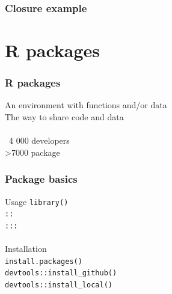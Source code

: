 \documentclass{beamer}
\begin{document}

\begin{frame}
	\frametitle{Closure example}
	\lstClosure
\end{frame}

\section{R packages}

\begin{frame}
	\frametitle{R packages}
	\begin{center}
		An environment with functions and/or data \\
		The way to share code and data \\~\\
		~4 000 developers \\
		\textgreater 7000 package \\
	\end{center}
\end{frame}

\begin{frame}
	\frametitle{Package basics}
	\begin{center}
		Usage
		\texttt{library()} \\
		\texttt{::} \\
		\texttt{:::} \\~\\
		Installation \\
		\texttt{install.packages()} \\
		\texttt{devtools::install\_github()} \\
		\texttt{devtools::install\_local()} \\
	\end{center}
\end{frame}
\end{document}
